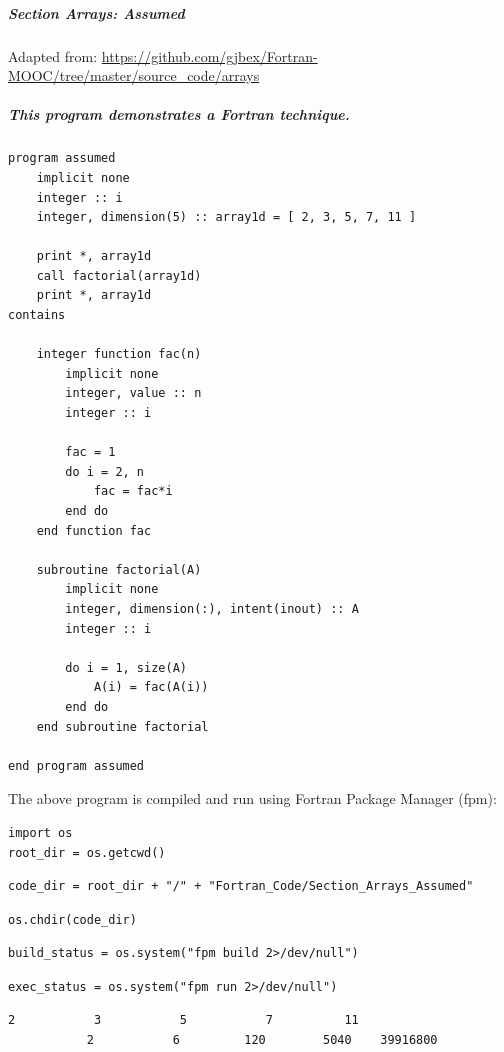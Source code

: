 \subparagraph{Section Arrays: Assumed}

Adapted from: \href{https://github.com/gjbex/Fortran-MOOC/tree/master/source\_code/arrays}{https://github.com/gjbex/Fortran-MOOC/tree/master/source\_code/arrays}

\subparagraph{This program demonstrates a Fortran technique.}

\begin{verbatim}
program assumed
    implicit none
    integer :: i
    integer, dimension(5) :: array1d = [ 2, 3, 5, 7, 11 ]

    print *, array1d
    call factorial(array1d)
    print *, array1d
contains

    integer function fac(n)
        implicit none
        integer, value :: n
        integer :: i

        fac = 1
        do i = 2, n
            fac = fac*i
        end do
    end function fac

    subroutine factorial(A)
        implicit none
        integer, dimension(:), intent(inout) :: A
        integer :: i

        do i = 1, size(A)
            A(i) = fac(A(i))
        end do
    end subroutine factorial

end program assumed
\end{verbatim}

The above program is compiled and run using Fortran Package Manager (fpm):

\begin{verbatim}
import os
root_dir = os.getcwd()
\end{verbatim}

\begin{verbatim}
code_dir = root_dir + "/" + "Fortran_Code/Section_Arrays_Assumed"
\end{verbatim}

\begin{verbatim}
os.chdir(code_dir)
\end{verbatim}

\begin{verbatim}
build_status = os.system("fpm build 2>/dev/null")
\end{verbatim}

\begin{verbatim}
exec_status = os.system("fpm run 2>/dev/null")
\end{verbatim}

\begin{verbatim}
2           3           5           7          11
           2           6         120        5040    39916800
\end{verbatim}